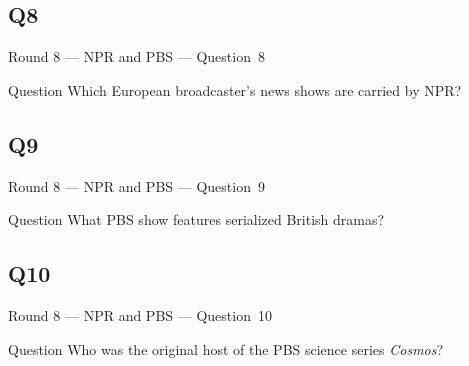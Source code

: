 \documentclass[11pt]{beamer}
\begin{document}
\subsection*{Q8}
\begin{frame}[t]{Round 8 --- NPR and PBS --- \mbox{Question 8}}
\vspace{-0.5em}
\begin{block}{Question}
Which European broadcaster's news shows are carried by NPR\@?
\end{block}
\end{frame}
\subsection*{Q9}
\begin{frame}[t]{Round 8 --- NPR and PBS --- \mbox{Question 9}}
\vspace{-0.5em}
\begin{block}{Question}
What PBS show features serialized British dramas?
\end{block}
\end{frame}
\subsection*{Q10}
\begin{frame}[t]{Round 8 --- NPR and PBS --- \mbox{Question 10}}
\vspace{-0.5em}
\begin{block}{Question}
Who was the original host of the PBS science series \emph{Cosmos}?
\end{block}
\end{frame}
\end{document}

